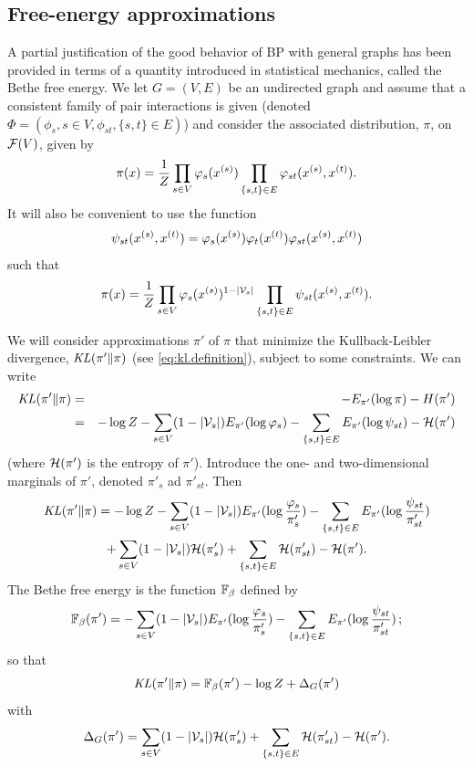 \subsection{Free-energy approximations}


A partial justification of the good behavior of BP with general graphs
has been provided in terms of a quantity introduced in statistical
mechanics, called the Bethe free energy. We let $G = (V,E)$ be an
undirected graph and assume that a consistent
family of pair interactions is given (denoted $\Phi = (\phi_s, s\in V,
\phi_{st}, \{s,t\}\in E)$) and consider the associated distribution,
$\pi$, on ${\mathcal F}(V)$, given by
\begin{equation}
\label{eq:pi.tree.2}
\pi(x) = \frac{1}{Z} \prod_{s\in V} \varphi_s(x^{(s)}) \prod_{\left\{ s,t \right\}\in E} \varphi_{st}(x^{(s)}, x^{(t)}).
\end{equation}
It will also be convenient to use the
function 
\[
\psi_{st}(x^{(s)},x^{(t)}) = \varphi_s(x^{(s)})\varphi_t(x^{(t)}) \varphi_{st}(x^{(s)}, x^{(t)})
\]
such that
\begin{equation}
\label{eq:pi.tree.3}
\pi(x) = \frac{1}{Z} \prod_{s\in V} \varphi_s(x^{(s)})^{1-|{\mathcal V}_s|} \prod_{\left\{ s,t \right\}\in E} \psi_{st}(x^{(s)}, x^{(t)}).
\end{equation}

We will consider approximations $\pi'$ of $\pi$ that minimize the
Kullback-Leibler divergence, $\mathit{KL}(\pi'\|\pi)$ (see  \cref{eq:kl.definition}), subject to some
constraints. 
We can write
\begin{eqnarray*}
\mathit{KL}(\pi'\|\pi) &=& -E_{\pi'} (\log\pi) - H(\pi')\\
&=& - \log Z -  \sum_{s\in V} (1-|{\mathcal V}_s|)E_{\pi'} (\log \varphi_s) -
\sum_{\left\{ s,t \right\}\in E} E_{\pi'} (\log \psi_{st}) - {\mathcal H}(\pi')
\end{eqnarray*}
(where ${\mathcal H}(\pi')$ is the entropy of $\pi'$).
Introduce the one- and two-dimensional marginals of $\pi'$, denoted
$\pi'_s$ ad $\pi'_{st}$. Then
\begin{multline*}
\mathit{KL}(\pi'\|\pi) = - \log Z -  \sum_{s\in V} (1-|{\mathcal V}_s|)E_{\pi'} (\log\frac{\varphi_s}{\pi'_s}) -
\sum_{\left\{ s,t \right\}\in E} E_{\pi'} (\log \frac{\psi_{st}}{\pi'_{st}}) \\
+
\sum_{s\in V} (1-|{\mathcal V}_s|) {\mathcal H}(\pi'_s) + \sum_{\left\{ s,t \right\}\in E}
{\mathcal H}(\pi'_{st}) -  {\mathcal H}(\pi').
\end{multline*}
The Bethe free energy is the function $\mathbb F_\beta$ defined by
\begin{equation}
\label{eq:bfe}
\mathbb F_\beta(\pi') = -  \sum_{s\in V} (1-|{\mathcal V}_s|)E_{\pi'} (\log \frac{\varphi_s}{\pi'_s} )-
\sum_{\left\{ s,t \right\}\in E} E_{\pi'} (\log \frac{\psi_{st}}{\pi'_{st}})\,;
\end{equation}
so that
$$
\mathit{KL}(\pi'\|\pi) = \mathbb F_\beta(\pi') -\log Z +
\Delta_G(\pi')
$$
with
$$
\Delta_G(\pi') = \sum_{s\in V} (1-|{\mathcal V}_s|) {\mathcal H}(\pi'_s) + \sum_{\left\{ s,t \right\}\in E}
{\mathcal H}(\pi'_{st}) - {\mathcal H}(\pi').
$$

